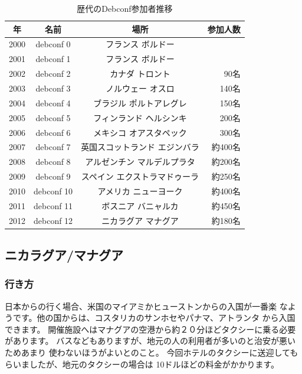\documentclass[mingoth,a4paper]{jsarticle}
\begin{document}
\begin{table}[H]
\caption{歴代のDebconf参加者推移}
\label{tab:debconflist}
 \begin{center}
 {\footnotesize
 \begin{tabular}{|c|c|c|r|}
 \hline
 年 & 名前 & 場所 & 参加人数 \\
 \hline
 2000 & debconf 0 &フランス ボルドー & \\
 2001 & debconf 1 &フランス ボルドー & \\
 2002 & debconf 2 &カナダ トロント & 90名 \\
 2003 & debconf 3 &ノルウェー オスロ & 140名 \\
 2004 & debconf 4 &ブラジル ポルトアレグレ &  150名 \\
 2005 & debconf 5 &フィンランド ヘルシンキ & 200名 \\
 2006 & debconf 6 &メキシコ オアスタペック & 300名 \\
 2007 & debconf 7 &英国スコットランド エジンバラ & 約400名 \\
 2008 & debconf 8 &アルゼンチン マルデルプラタ & 約200名 \\               
 2009 & debconf 9 &スペイン エクストラマドゥーラ & 約250名 \\
 2010 & debconf 10 &アメリカ ニューヨーク & 約400名 \\
 2011 & debconf 11 &ボスニア バニャルカ & 約450名 \\
 2012 & debconf 12 &ニカラグア マナグア & 約180名 \\
 \hline
 \end{tabular}
 }
 \end{center}
\end{table}

\subsection{ニカラグア/マナグア}

\subsubsection{行き方}
日本からの行く場合、米国のマイアミかヒューストンからの入国が一番楽
なようです。他の国からは、コスタリカのサンホセやパナマ、アトランタ
から入国できます。
開催施設へはマナグアの空港から約２０分ほどタクシーに乗る必要があります。
バスなどもありますが、地元の人の利用者が多いのと治安が悪いためあまり
使わないほうがよいとのこと。
今回ホテルのタクシーに送迎してもらいましたが、地元のタクシーの場合は
10ドルほどの料金がかかります。
\end{document}
